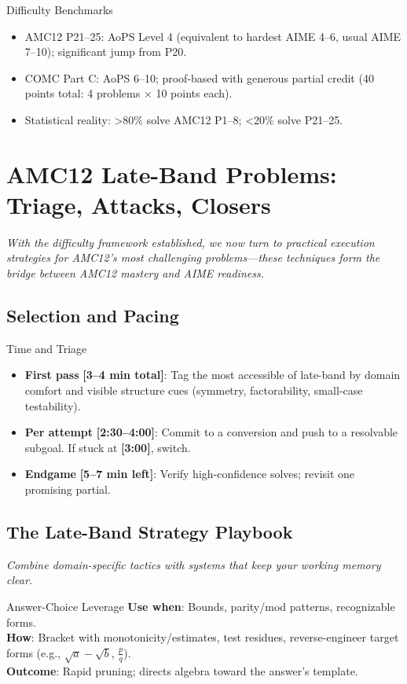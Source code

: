\documentclass{article}
\newcommand{\timetarget}[1]{\textcolor{timingblue}{\textbf{[#1]}}}
\begin{document}
\begin{successbox}{Difficulty Benchmarks}
\begin{itemize}[nosep]
\item AMC12 P21--25: AoPS Level 4 (equivalent to hardest AIME 4--6, usual AIME 7--10); significant jump from P20.
\item COMC Part C: AoPS 6--10; proof-based with generous partial credit (40 points total: 4 problems × 10 points each).
\item Statistical reality: >80\% solve AMC12 P1--8; <20\% solve P21--25.
\end{itemize}
\end{successbox}

\newpage

\section{AMC12 Late-Band Problems: Triage, Attacks, Closers}

\textit{With the difficulty framework established, we now turn to practical execution strategies for AMC12's most challenging problems---these techniques form the bridge between AMC12 mastery and AIME readiness.}

\subsection{Selection and Pacing}
\begin{strategybox}{Time and Triage}
\begin{itemize}
    \item \textbf{First pass} \timetarget{3--4 min total}: Tag the most accessible of late-band by domain comfort and visible structure cues (symmetry, factorability, small-case testability).
    \item \textbf{Per attempt} \timetarget{2:30--4:00}: Commit to a conversion and push to a resolvable subgoal. If stuck at \timetarget{3:00}, switch.
    \item \textbf{Endgame} \timetarget{5--7 min left}: Verify high-confidence solves; revisit one promising partial.
\end{itemize}
\end{strategybox}

\subsection{The Late-Band Strategy Playbook}
\textit{Combine domain-specific tactics with systems that keep your working memory clear.}
\begin{strategybox}{Answer-Choice Leverage}
\textbf{Use when}: Bounds, parity/mod patterns, recognizable forms.\\
\textbf{How}: Bracket with monotonicity/estimates, test residues, reverse-engineer target forms (e.g., $\sqrt{a}-\sqrt{b}$, $\tfrac{p}{q}$).\\
\textbf{Outcome}: Rapid pruning; directs algebra toward the answer's template.
\end{strategybox}
\end{document}
